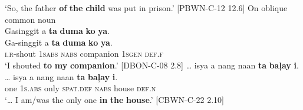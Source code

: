 \glt ‘So, the father \textbf{of} \textbf{the} \textbf{child} was put in prison.’ [PBWN-C-12 12.6]
\z
\ea \label{bkm:Ref447721090}
On oblique common noun \\
Gasinggit  a  \textbf{ta}  \textbf{duma}  \textbf{ko}  \textbf{ya}. \\\smallskip
 \gll Ga-singgit  a  \textbf{ta}  \textbf{duma}  \textbf{ko}  \textbf{ya}. \\
\textsc{i.r}-shout  \textsc{1sabs}  \textsc{nabs}  companion  \textsc{1sgen  def.f} \\
\glt ‘I shouted \textbf{to} \textbf{my} \textbf{companion}.’ [DBON-C-08  2.8]
\z
\ea
… isya  a  nang  naan  \textbf{ta}  \textbf{baļay}  \textbf{i}. \\\smallskip
 \gll … isya  a  nang  naan  \textbf{ta}  \textbf{baļay}  \textbf{i}. \\
   {} one  1\textsc{s.abs}  only  \textsc{spat.def}  \textsc{nabs}  house  \textsc{def.n} \\
\glt ‘… I am/was the only one \textbf{in} \textbf{the} \textbf{house}.’ [CBWN-C-22 2.10]
\z

